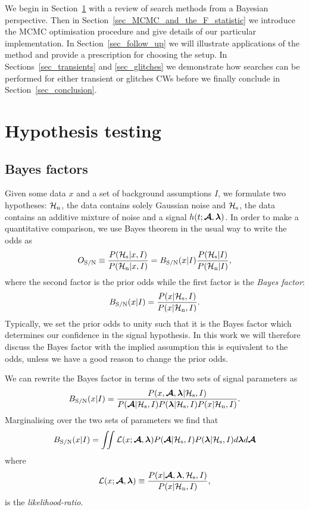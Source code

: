 \documentclass[aps, prd, twocolumn, superscriptaddress, floatfix, showpacs, nofootinbib, longbibliography]{revtex4-1}
\begin{document}
We begin in Section~\ref{sec_hypothesis_testing} with a review of search
methods from a Bayesian perspective. Then in
Section~\ref{sec_MCMC_and_the_F_statistic} we introduce the MCMC optimisation
procedure and give details of our particular implementation. In
Section~\ref{sec_follow_up} we will illustrate applications of the method and
provide a prescription for choosing the setup. In Sections~\ref{sec_transients}
and \ref{sec_glitches} we demonstrate how searches can be performed for either
transient or glitches CWs before we finally conclude in
Section~\ref{sec_conclusion}.

\section{Hypothesis testing}
\label{sec_hypothesis_testing}

\subsection{Bayes factors}
Given some data $x$ and a set of background assumptions $I$, we formulate
two hypotheses: $\mathcal{H}_{\rm n}$, the data contains solely Gaussian noise and $\mathcal{H}_{\rm s}$, the
data contains an additive mixture of noise and a signal $h(t; \boldsymbol{\mathcal{A}}, \boldsymbol{\mathbf{\lambda}})$.
In order to make a quantitative comparison, we use Bayes theorem in the usual
way to write the odds as
\begin{equation}
O_{\rm S/N} \equiv \frac{P(\mathcal{H}_{\rm s}| x, I)}{P(\mathcal{H}_{\rm n}| x, I)} =
B_{\rm S/N}(x| I) \frac{P(\mathcal{H}_{\rm s}| I)}{P(\mathcal{H}_{\rm n} | I)},
\end{equation}
where the second factor is the prior odds while the first factor is the
\emph{Bayes factor}:
\begin{equation}
B_{\rm S/N}(x| I) = \frac{P(x| \mathcal{H}_{\rm s}, I)}{P(x| \mathcal{H}_{\rm n}, I)}.
\end{equation}
Typically, we set the prior odds to unity such that it is the Bayes factor
which determines our confidence in the signal hypothesis. In this work we will
therefore discuss the Bayes factor with the implied assumption this is
equivalent to the odds, unless we have a good reason to change the prior odds.

We can rewrite the Bayes factor in terms of the two sets of signal parameters
as
\begin{equation}
B_{\rm S/N}(x| I) = \frac{P(x, \boldsymbol{\mathcal{A}}, \boldsymbol{\mathbf{\lambda}}|\mathcal{H}_{\rm s}, I)}
{P(\boldsymbol{\mathcal{A}}| \mathcal{H}_{\rm s}, I)P(\boldsymbol{\mathbf{\lambda}}| \mathcal{H}_{\rm s}, I)P(x| \mathcal{H}_{\rm n}, I)}.
\end{equation}
Marginalising over the two sets of parameters we find that
\begin{equation}
B_{\rm S/N}(x| I)= \iint
\mathcal{L}(x; \boldsymbol{\mathcal{A}}, \boldsymbol{\mathbf{\lambda}})
P(\boldsymbol{\mathcal{A}}| \mathcal{H}_{\rm s}, I)P(\boldsymbol{\mathbf{\lambda}}| \mathcal{H}_{\rm s}, I)
d\boldsymbol{\mathbf{\lambda}} d\boldsymbol{\mathcal{A}}
\label{eqn_full_bayes}
\end{equation}
where
\begin{equation}
\mathcal{L}(x; \boldsymbol{\mathcal{A}}, \boldsymbol{\mathbf{\lambda}}) \equiv \frac{P(x |\boldsymbol{\mathcal{A}}, \boldsymbol{\mathbf{\lambda}}, \mathcal{H}_{\rm s}, I)}{P(x| \mathcal{H}_{\rm n}, I)},
\label{eqn_likelihood}
\end{equation}
is the \emph{likelihood-ratio}.
\end{document}
